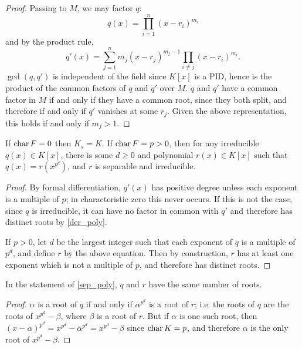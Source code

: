 \begin{proof} Passing to $M$, we may factor $q$:
\begin{equation*}
q(x) = \prod_{i = 1}^n (x - r_i)^{m_i}
\end{equation*}
and by the product rule,
\begin{equation*}
q'(x) = \sum_{j = 1}^n m_j (x - r_j)^{m_j - 1} \prod_{i \neq j} (x -
	r_i)^{m_i}.
\end{equation*}
$\gcd(q, q')$ is independent of the field since $K[x]$ is a PID, hence is the
product of the common factors of $q$ and $q'$ over $M$.  $q$ and $q'$ have a
common factor in $M$ if and only if they have a common root, since they both
split, and therefore if and only if $q'$ vanishes at some $r_j$.  Given the
above representation, this holds if and only if $m_j > 1$. \end{proof}

\begin{lemma} If $\operatorname{\text{char}}{F} = 0$ then $K_s = K$.  If $\operatorname{\text{char}}{F} = p > 0$, then for
any irreducible $q(x) \in K[x]$, there is some $d \geq 0$ and polynomial $r(x)
\in K[x]$ such that $q(x) = r(x^{p^d})$, and $r$ is separable and irreducible.
\label{sep_poly}
\end{lemma}

\begin{proof} By formal differentiation, $q'(x)$ has positive degree unless
each exponent is a multiple of $p$; in characteristic zero this never occurs.
If this is not the case, since $q$ is irreducible, it can have no factor in
common with $q'$ and therefore has distinct roots by \cref{der_poly}.

If $p > 0$, let $d$ be the largest integer such that each exponent of $q$ is a
multiple of $p^d$, and define $r$ by the above equation.  Then by
construction, $r$ has at least one exponent which is not a multiple of $p$,
and therefore has distinct roots. \end{proof}

\begin{corollary} In the statement of \cref{sep_poly}, $q$ and $r$ have the same
number of roots.
\label{sep_roots}
\end{corollary}

\begin{proof} $\alpha$ is a root of $q$ if and only if $\alpha^{p^d}$ is a
root of $r$; i.e. the roots of $q$ are the roots of $x^{p^d} - \beta$, where
$\beta$ is a root of $r$.  But if $\alpha$ is one such root, then $(x -
\alpha)^{p^d} = x^{p^d} - \alpha^{p^d} = x^{p^d} - \beta$ since $\operatorname{\text{char}}{K} =
p$, and therefore $\alpha$ is the only root of $x^{p^d} - \beta$. \end{proof}

